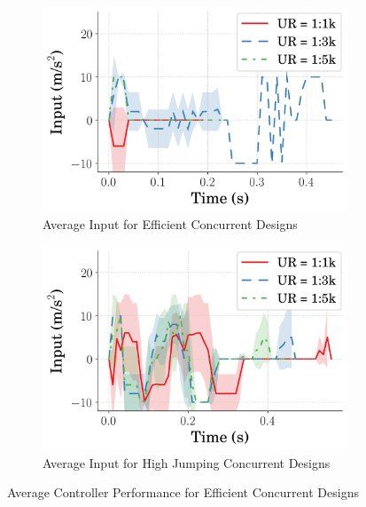 \begin{figure}[tb!]
  \centering
  \begin{subfigure}{.49\textwidth}
    \centering
    \includegraphics[width=\textwidth]{figures/Ch5/comp_update_rate/avg_eff_Input_.png}  
    \caption{Average Input for Efficient Concurrent Designs}
    \label{fig:comp_ur_input_eff}
  \end{subfigure}%
  \hfill
  \begin{subfigure}{.49\textwidth}
    \centering
    \includegraphics[width=\textwidth]{figures/Ch5/comp_update_rate/avg_hei_Input_.png}  
    \caption{Average Input for High Jumping Concurrent Designs}
    \label{fig:comp_ur_input_hei}
  \end{subfigure}%
   \caption{Average Controller Performance for Efficient Concurrent Designs}
   \label{fig:comp_ur_input}
\end{figure}
% 

